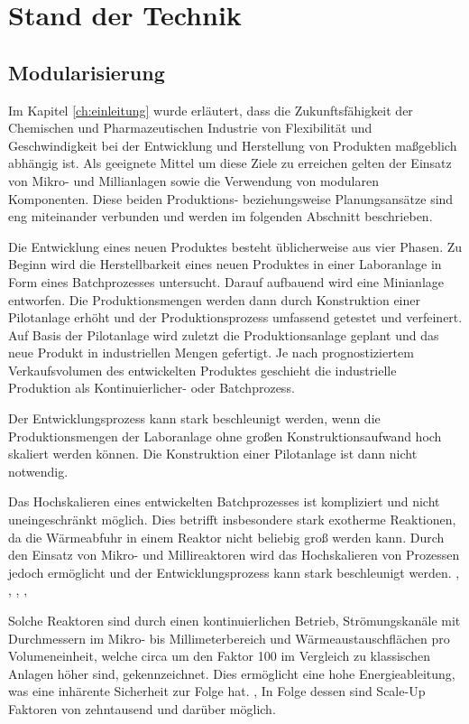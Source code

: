 \chapter{Stand der Technik} \label{ch:sdt}
\section{Modularisierung}
Im Kapitel \ref{ch:einleitung} wurde erl\"autert, dass die Zukunftsf\"ahigkeit der Chemischen und Pharmazeutischen Industrie von Flexibilit\"at und Geschwindigkeit bei der Entwicklung und Herstellung von Produkten ma\ss{}geblich abh\"angig ist. Als geeignete Mittel um diese Ziele zu erreichen gelten der Einsatz von Mikro- und Millianlagen sowie die Verwendung von modularen Komponenten. Diese beiden Produktions- beziehungsweise Planungsans\"atze sind eng miteinander verbunden und werden im folgenden Abschnitt beschrieben.  


Die Entwicklung eines neuen Produktes besteht \"ublicherweise aus vier Phasen. Zu Beginn wird die Herstellbarkeit eines neuen Produktes in einer Laboranlage in Form eines Batchprozesses untersucht. Darauf aufbauend wird eine Minianlage entworfen. Die Produktionsmengen werden dann durch Konstruktion einer Pilotanlage erh\"oht und der Produktionsprozess umfassend getestet und verfeinert. Auf Basis der Pilotanlage wird zuletzt die Produktionsanlage geplant und das neue Produkt in industriellen Mengen gefertigt. Je nach prognostiziertem Verkaufsvolumen des entwickelten Produktes geschieht die industrielle Produktion als Kontinuierlicher- oder Batchprozess. \cite{Grundemann_2012}

Der  Entwicklungsprozess kann stark beschleunigt werden, wenn die Produktionsmengen der Laboranlage ohne gro\ss{}en Konstruktionsaufwand hoch skaliert werden k\"onnen. Die Konstruktion einer Pilotanlage ist dann nicht notwendig.

Das Hochskalieren eines entwickelten Batchprozesses ist kompliziert und nicht uneingeschr\"ankt m\"oglich. Dies betrifft insbesondere stark exotherme Reaktionen, da die W\"armeabfuhr in einem Reaktor nicht beliebig gro\ss{} werden kann. \cite{Brodhagen_2012} \linebreak
Durch den Einsatz von Mikro- und Millireaktoren wird das Hochskalieren von Prozessen jedoch erm\"oglicht und der Entwicklungsprozess kann stark beschleunigt werden. \cite{Grundemann_2012}, \cite{Brodhagen_2012}, \cite{Helling_2012}, \cite{Kockmann_2012}, \cite{Hessel_2012}

Solche Reaktoren sind durch einen kontinuierlichen Betrieb, Str\"omungskan\"ale mit Durchmessern im Mikro- bis Millimeterbereich und W\"armeaustauschfl\"achen pro Volumeneinheit, welche circa um den Faktor 100 im Vergleich zu klassischen Anlagen h\"oher sind, gekennzeichnet. Dies erm\"oglicht eine hohe Energieableitung, was eine inh\"arente Sicherheit zur Folge hat. \cite{Brodhagen_2012}, \cite{Kockmann_2012a} In Folge dessen sind Scale-Up Faktoren von zehntausend und dar\"uber m\"oglich. \cite{Behr_2012}

